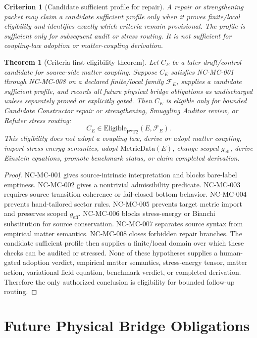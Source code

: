 \documentclass[11pt]{article}
\newcommand{\geff}{g_{\mathrm{eff}}}
\newcommand{\MetricData}{\mathrm{MetricData}}
\newcommand{\Eligible}{\mathrm{Eligible}_{\mathrm{P7T2}}}
\newtheorem{criterion}{Criterion}
\newtheorem{theorem}{Theorem}
\begin{document}
\begin{criterion}[Candidate sufficient profile for repair]
A repair or strengthening packet may claim a candidate sufficient profile only
when it proves finite/local eligibility and identifies exactly which criteria
remain provisional. The profile is sufficient only for subsequent audit or
stress routing. It is not sufficient for coupling-law adoption or
matter-coupling derivation.
\end{criterion}

\begin{theorem}[Criteria-first eligibility theorem]
Let \(C_E\) be a later draft/control candidate for source-side matter coupling.
Suppose \(C_E\) satisfies NC-MC-001 through NC-MC-008 on a declared finite/local
family \(\mathcal{F}_E\), supplies a candidate sufficient profile, and records
all future physical bridge obligations as undischarged unless separately
proved or explicitly gated. Then \(C_E\) is eligible only for bounded
Candidate Constructor repair or strengthening, Smuggling Auditor review, or
Refuter stress routing:
\[
  C_E \in \Eligible(E,\mathcal{F}_E).
\]
This eligibility does not adopt a coupling law, derive or adopt matter
coupling, import stress-energy semantics, adopt \(\MetricData(E)\), change
scoped \(\geff\), derive Einstein equations, promote benchmark status, or
claim completed derivation.
\end{theorem}

\begin{proof}
NC-MC-001 gives source-intrinsic interpretation and blocks bare-label
emptiness. NC-MC-002 gives a nontrivial admissibility predicate. NC-MC-003
requires source transition coherence or fail-closed bottom behavior. NC-MC-004
prevents hand-tailored sector rules. NC-MC-005 prevents target metric import
and preserves scoped \(\geff\). NC-MC-006 blocks stress-energy or Bianchi
substitution for source conservation. NC-MC-007 separates source syntax from
empirical matter semantics. NC-MC-008 closes forbidden repair branches. The
candidate sufficient profile then supplies a finite/local domain over which
these checks can be audited or stressed. None of these hypotheses supplies a
human-gated adoption verdict, empirical matter semantics, stress-energy
tensor, matter action, variational field equation, benchmark verdict, or
completed derivation. Therefore the only authorized conclusion is eligibility
for bounded follow-up routing.
\end{proof}

\section{Future Physical Bridge Obligations}
\end{document}
